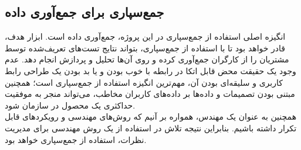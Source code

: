 \subsection{جمع‌سپاری برای جمع‌آوری داده}
انگیزه اصلی استفاده از جمع‌سپاری در این پروژه، جمع‌آوری داده است. ابزار هدف، قادر خواهد بود تا با استفاده از جمع‌سپاری، بتواند نتایج تست‌های تعریف‌شده توسط مشتریان را از کارگران جمع‌آوری کرده و روی آن‌ها تحلیل و پردازش انجام دهد. عدم وجود یک حقیقت محض قابل اتکا
در رابطه با خوب بودن و یا بد بودن یک طراحی رابط کاربری و سلیقه‌ای بودن آن، مهم‌ترین انگیزه استفاده از جمع‌سپاری است؛ همچنین مبتنی بودن تصمیمات و داده‌ها بر داده‌های کاربران مخاطب، می‌تواند منجر به موفقیت حداکثری یک محصول در سازمان شود.\\
همچنین به عنوان یک مهندس، همواره بر آنیم که روش‌های مهندسی و رویکردهای قابل تکرار داشته باشیم. بنابراین نتیجه تلاش در استفاده از یک روش مهندسی برای مدیریت نظرات، استفاده از جمع‌سپاری خواهد بود.
